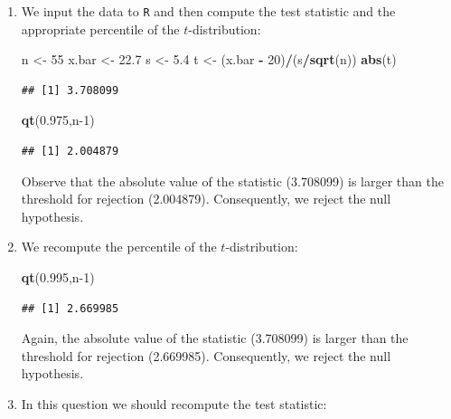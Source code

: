 \documentclass[
]{krantz}
\makeatletter
\newenvironment{Shaded}{\begin{snugshade}}{\end{snugshade}}
\newcommand{\DecValTok}[1]{\textcolor[rgb]{0.00,0.00,0.81}{#1}}
\newcommand{\FloatTok}[1]{\textcolor[rgb]{0.00,0.00,0.81}{#1}}
\newcommand{\KeywordTok}[1]{\textcolor[rgb]{0.13,0.29,0.53}{\textbf{#1}}}
\newcommand{\NormalTok}[1]{#1}
\newcommand{\OperatorTok}[1]{\textcolor[rgb]{0.81,0.36,0.00}{\textbf{#1}}}
\newcommand{\StringTok}[1]{\textcolor[rgb]{0.31,0.60,0.02}{#1}}
\newenvironment{kframe}{%
\medskip{}
\setlength{\fboxsep}{.8em}
 \def\at@end@of@kframe{}%
 \ifinner\ifhmode%
  \def\at@end@of@kframe{\end{minipage}}%
  \begin{minipage}{\columnwidth}%
 \fi\fi%
 \def\FrameCommand##1{\hskip\@totalleftmargin \hskip-\fboxsep
 \colorbox{shadecolor}{##1}\hskip-\fboxsep
     \hskip-\linewidth \hskip-\@totalleftmargin \hskip\columnwidth}%
 \MakeFramed {\advance\hsize-\width
   \@totalleftmargin\z@ \linewidth\hsize
   \@setminipage}}%
 {\par\unskip\endMakeFramed%
 \at@end@of@kframe}
\renewenvironment{Shaded}{\begin{kframe}}{\end{kframe}}
\theoremstyle{definition}
\theoremstyle{definition}
\theoremstyle{definition}
\theoremstyle{remark}
\makeatother
\begin{document}
\begin{enumerate}
\def\labelenumi{\arabic{enumi}.}
\item
  We input the data to \texttt{R} and then
  compute the test statistic and the appropriate percentile of the
  \(t\)-distribution:

\begin{Shaded}
\begin{Highlighting}[]
\NormalTok{n <-}\StringTok{ }\DecValTok{55}
\NormalTok{x.bar <-}\StringTok{ }\FloatTok{22.7}
\NormalTok{s <-}\StringTok{ }\FloatTok{5.4}
\NormalTok{t <-}\StringTok{ }\NormalTok{(x.bar }\OperatorTok{-}\StringTok{ }\DecValTok{20}\NormalTok{)}\OperatorTok{/}\NormalTok{(s}\OperatorTok{/}\KeywordTok{sqrt}\NormalTok{(n))}
\KeywordTok{abs}\NormalTok{(t)}
\end{Highlighting}
\end{Shaded}

\begin{verbatim}
## [1] 3.708099
\end{verbatim}

\begin{Shaded}
\begin{Highlighting}[]
\KeywordTok{qt}\NormalTok{(}\FloatTok{0.975}\NormalTok{,n}\DecValTok{-1}\NormalTok{)}
\end{Highlighting}
\end{Shaded}

\begin{verbatim}
## [1] 2.004879
\end{verbatim}

  Observe that the absolute value of the statistic (3.708099) is larger
  than the threshold for rejection (2.004879). Consequently, we reject the
  null hypothesis.
\item
  We recompute the percentile of the \(t\)-distribution:

\begin{Shaded}
\begin{Highlighting}[]
\KeywordTok{qt}\NormalTok{(}\FloatTok{0.995}\NormalTok{,n}\DecValTok{-1}\NormalTok{)}
\end{Highlighting}
\end{Shaded}

\begin{verbatim}
## [1] 2.669985
\end{verbatim}

  Again, the absolute value of the statistic (3.708099) is larger than the
  threshold for rejection (2.669985). Consequently, we reject the null
  hypothesis.
\item
  In this question we should recompute the test statistic:


\end{enumerate}
\end{document}
